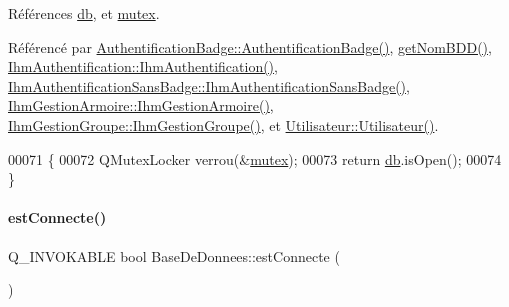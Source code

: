 Références \hyperlink{class_base_de_donnees_a3e738dcf443370c46a541677ab619f06}{db}, et \hyperlink{class_base_de_donnees_aa1b4696fac87a740f914aa73739086f2}{mutex}.



Référencé par \hyperlink{class_authentification_badge_a6c27fe0dc2a4a20fec1e75da5b400146}{Authentification\+Badge\+::\+Authentification\+Badge()}, \hyperlink{class_base_de_donnees_a467909531ae3cdebaf173f6e97cdc624}{get\+Nom\+B\+D\+D()}, \hyperlink{class_ihm_authentification_a09e60cbdf8d1377e17d940463acb75ba}{Ihm\+Authentification\+::\+Ihm\+Authentification()}, \hyperlink{class_ihm_authentification_sans_badge_aace6d9eebcab9fee429fe9dbb6840f15}{Ihm\+Authentification\+Sans\+Badge\+::\+Ihm\+Authentification\+Sans\+Badge()}, \hyperlink{class_ihm_gestion_armoire_a7aa5e1514dd5d1b5648a2f6dd36970f9}{Ihm\+Gestion\+Armoire\+::\+Ihm\+Gestion\+Armoire()}, \hyperlink{class_ihm_gestion_groupe_a27632f9cf5b66f4403c3534ee0e0ad18}{Ihm\+Gestion\+Groupe\+::\+Ihm\+Gestion\+Groupe()}, et \hyperlink{class_utilisateur_ae76433a6d353c5f5ad0c6a6af64022ad}{Utilisateur\+::\+Utilisateur()}.


\begin{DoxyCode}
00071 \{
00072     QMutexLocker verrou(&\hyperlink{class_base_de_donnees_aa1b4696fac87a740f914aa73739086f2}{mutex});
00073     \textcolor{keywordflow}{return} \hyperlink{class_base_de_donnees_a3e738dcf443370c46a541677ab619f06}{db}.isOpen();
00074 \}
\end{DoxyCode}
\mbox{\label{class_base_de_donnees_aac406beb5ea0e786415eca02a94633fd}} 
\paragraph{\texorpdfstring{est\+Connecte()}{estConnecte()}\hspace{0.1cm}{\footnotesize\ttfamily [2/2]}}
{\footnotesize\ttfamily Q\+\_\+\+I\+N\+V\+O\+K\+A\+B\+LE bool Base\+De\+Donnees\+::est\+Connecte (\begin{DoxyParamCaption}{ }\end{DoxyParamCaption})}

\mbox{\label{class_base_de_donnees_af9ac332082ffd0dd35e412cefabe5e9c}} 
